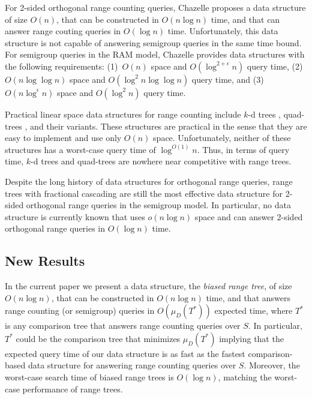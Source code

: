 \documentclass[lotsofwhite,charterfonts]{patmorin}
\begin{document}
For 2-sided orthogonal range counting queries, Chazelle
\cite{ae55,ae58} proposes a data structure of size $O(n)$, that can be
constructed in $O(n\log n)$ time, and that can answer range couting
queries in $O(\log n)$ time.  Unfortunately, this data structure is
not capable of answering semigroup queries in the same time bound.
For semigroup queries in the RAM model, Chazelle provides data
structures with the following requirements: (1)~$O(n)$ space and
$O(\log^{2+\epsilon} n)$ query time, (2)~$O(n\log\log n)$ space and
$O(\log^{2}n\log\log n)$ query time, and (3)~$O(n\log^\epsilon n)$
space and $O(\log^2 n)$ query time.

Practical linear space data structures for range counting include
$k$-d trees \cite{ae41}, quad-trees \cite{ae251}, and their
variants.  These structures are practical in the sense that they are
easy to implement and use only $O(n)$ space.  Unfortunately, neither
of these structures has a worst-case query time of $\log^{O(1)} n$.
Thus, in terms of query time, $k$-d trees and quad-trees are nowhere
near competitive with range trees.


Despite the long history of data structures for orthogonal range
queries, range trees with fractional cascading are still the most
effective data structure for 2-sided orthogonal range queries in the
semigroup model.  In particular, no data structure is currently known
that uses $o(n\log n)$ space and can answer 2-sided orthogonal range
queries in $O(\log n)$ time. 

\subsection{New Results}

In the current paper we present a data structure, the \emph{biased
range tree}, of size $O(n\log n)$, that can be constructed in $O(n\log
n)$ time, and that answers range counting (or semigroup) queries in
$O(\mu_D(T^*))$ expected time, where $T^*$ is any comparison tree that
answers range counting queries over $S$.  In particular, $T^*$ could
be the comparison tree that minimizes $\mu_D(T^*)$ implying that the
expected query time of our data structure is as fast as the fastest
comparison-based data structure for answering range counting queries
over $S$.  Moreover, the worst-case search time of biased range trees
is $O(\log n)$, matching the worst-case performance of range trees.
\end{document}
